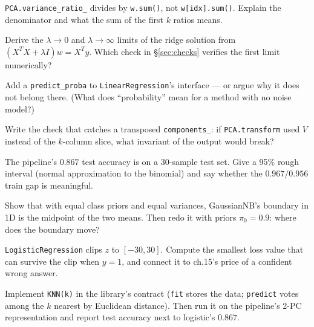\begin{exercise}[easy]
\texttt{PCA.variance\_ratio\_} divides by \texttt{w.sum()}, not
\texttt{w[idx].sum()}. Explain the denominator and what the sum of
the first $k$ ratios means.
\end{exercise}

\begin{exercise}[medium]
Derive the $\lambda\to0$ and $\lambda\to\infty$ limits of the ridge
solution from $(X^TX+\lambda I)w=X^Ty$. Which check in
\S\ref{sec:checks} verifies the first limit numerically?
\end{exercise}

\begin{exercise}[medium]
Add a \texttt{predict\_proba} to \texttt{LinearRegression}'s
interface --- or argue why it does not belong there. (What does
``probability'' mean for a method with no noise model?)
\end{exercise}

\begin{exercise}[medium]
Write the check that catches a transposed \texttt{components\_}: if
\texttt{PCA.transform} used $V$ instead of the $k$-column slice,
what invariant of the output would break?
\end{exercise}

\begin{exercise}[medium]
The pipeline's $0.867$ test accuracy is on a $30$-sample test set.
Give a 95\% rough interval (normal approximation to the binomial)
and say whether the $0.967/0.956$ train gap is meaningful.
\end{exercise}

\begin{exercise}[medium]
Show that with equal class priors and equal variances,
GaussianNB's boundary in 1D is the midpoint of the two means. Then
redo it with priors $\pi_0=0.9$: where does the boundary move?
\end{exercise}

\begin{exercise}[medium]
\texttt{LogisticRegression} clips $z$ to $[-30,30]$. Compute the
smallest loss value that can survive the clip when $y=1$, and
connect it to ch.15's price of a confident wrong answer.
\end{exercise}

\begin{exercise}[hard]
Implement \texttt{KNN(k)} in the library's contract
(\texttt{fit} stores the data; \texttt{predict} votes among the $k$
nearest by Euclidean distance). Then run it on the pipeline's 2-PC
representation and report test accuracy next to logistic's
$0.867$.
\end{exercise}

